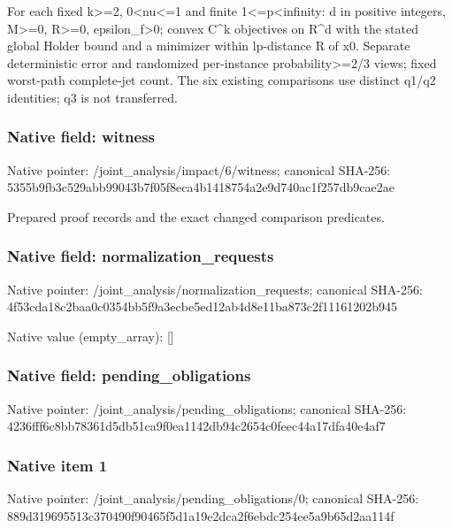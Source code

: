 \documentclass[10pt,a4paper]{article}
\begin{document}
\begingroup\raggedright\sloppy For each fixed k>=\allowbreak{}2,\allowbreak{} 0<nu<=\allowbreak{}1 and finite 1<=\allowbreak{}p<infinity:\allowbreak{} d in positive integers,\allowbreak{} M>=\allowbreak{}0,\allowbreak{} R>=\allowbreak{}0,\allowbreak{} epsilon\_\allowbreak{}f>0;\allowbreak{} convex C\textasciicircum{}k objectives on R\textasciicircum{}d with the stated global Holder bound and a minimizer within lp-distance R of x0. Separate deterministic error and randomized per-instance probability>=\allowbreak{}2/\allowbreak{}3 views;\allowbreak{} fixed worst-path complete-jet count. The six existing comparisons use distinct q1/\allowbreak{}q2 identities;\allowbreak{} q3 is not transferred.\par\endgroup

\subsubsection{Native field: witness}
Native pointer: /joint\_\allowbreak{}analysis/impact/6/witness; canonical SHA-256: 5355b9fb3c529abb99043b7f05f8eca4b1418754a2e9d740ac1f257db9cae2ae

\begingroup\raggedright\sloppy Prepared proof records and the exact changed comparison predicates.\par\endgroup

\subsubsection{Native field: normalization\_\allowbreak{}requests}
Native pointer: /joint\_\allowbreak{}analysis/normalization\_\allowbreak{}requests; canonical SHA-256: 4f53cda18c2baa0c0354bb5f9a3ecbe5ed12ab4d8e11ba873c2f11161202b945

Native value (empty\_\allowbreak{}array): []

\subsubsection{Native field: pending\_\allowbreak{}obligations}
Native pointer: /joint\_\allowbreak{}analysis/pending\_\allowbreak{}obligations; canonical SHA-256: 4236fff6c8bb78361d5db51ca9f0ea1142db94c2654c0feec44a17dfa40e4af7

\subsubsection{Native item 1}
Native pointer: /joint\_\allowbreak{}analysis/pending\_\allowbreak{}obligations/0; canonical SHA-256: 889d319695513c370490f90465f5d1a19e2dca2f6ebdc254ee5a9b65d2aa114f
\end{document}
